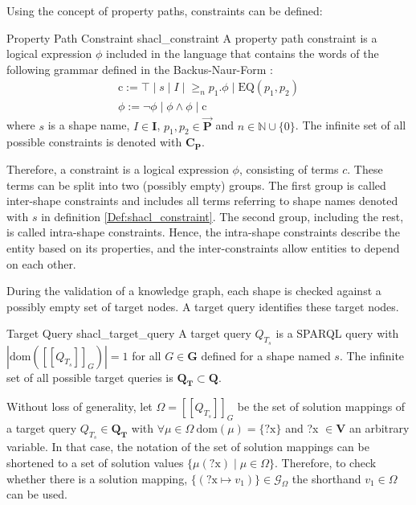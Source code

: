 Using the concept of property paths, constraints can be defined:

\begin{Def}{Property Path Constraint \cite{corman2018semantics}}{shacl_constraint}
A property path constraint is a logical expression $\phi$ included in the language that contains the words of the following grammar defined in the Backus-Naur-Form \cite{backusForm}:
\begin{gather*}
    \text{c} := \top \mid s \mid I \mid {\geq}_n p_1.\phi \mid \text{EQ}(p_1,p_2)\\
    \phi := \neg \phi \mid \phi \land \phi \mid \text{c}
\end{gather*}
where $s$ is a shape name, $I \in \mathbf{I}$, $p_1,p_2 \in \overrightarrow{\mathbf{P}}$ and $n \in \mathbb{N} \cup \{0\}$.
The infinite set of all possible constraints is denoted with $\mathbf{C_P}$.
\end{Def}

Therefore, a constraint is a logical expression $\phi$, consisting of terms $c$. These terms can be split into two (possibly empty) groups. The first group is called inter-shape constraints and includes all terms referring to shape names denoted with $s$ in definition \ref{Def:shacl_constraint}. The second group, including the rest, is called intra-shape constraints. Hence, the intra-shape constraints describe the entity based on its properties, and the inter-constraints allow entities to depend on each other.

During the validation of a knowledge graph, each shape is checked against a possibly empty set of target nodes. A target query identifies these target nodes.
\begin{Def}{Target Query \cite{corman2018semantics}}{shacl_target_query}
A target query $Q_{T_s}$ is a SPARQL  query with $|\text{dom}([[Q_{T_s}]]_G)| = 1$ for all $G \in \mathbf{G}$ defined for a shape named $s$. The infinite set of all possible target queries is $\mathbf{Q_T} \subset \mathbf{Q}$.
\end{Def}

Without loss of generality, let $\Omega = [[Q_{T_s}]]_G$ be the set of solution mappings of a target query $Q_{T_s} \in \mathbf{Q_T}$ with $\forall \mu \in \Omega ~ \text{dom}(\mu) = \{\text{?x}\}$ and ?x $\in \mathbf{V}$ an arbitrary variable. In that case, the notation of the set of solution mappings can be shortened to a set of solution values $\{\mu(\text{?x}) \mid \mu \in \Omega \}$. Therefore, to check whether there is a solution mapping, $\{(\text{?x} \mapsto v_1)\} \in \mathcal{G}_\Omega$ the shorthand $v_1 \in \Omega$ can be used.

